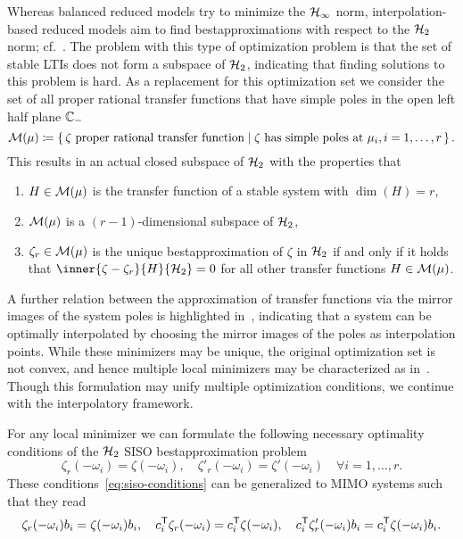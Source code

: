 Whereas balanced reduced models try to minimize the $\mathcal{H}_\infty$ norm, interpolation-based reduced models aim to find bestapproximations with respect to the $\mathcal{H}_2$ norm; cf.~\cite[Section~3]{Gugercin2008}.
The problem with this type of optimization problem is that the set of stable \acp{LTI} does not form a subspace of $\mathcal{H}_2$, indicating that finding solutions to this problem is hard.
As a replacement for this optimization set we consider the set of all proper rational transfer functions that have simple poles in the open left half plane $\mathbb{C}_{-}$
\begin{equation*}
    \mathcal{M}(\mu) \coloneqq \left\{\,\zeta \text{ proper rational transfer function}\mid\zeta \text{ has simple poles at } \mu_i, i = 1, \dots, r\,\right\}.
\end{equation*}
This results in an actual closed subspace of $\mathcal{H}_2$ with the properties that
\begin{enumerate}
    \item $H \in \mathcal{M}(\mu)$ is the transfer function of a stable system with $\dim{(H)} = r$,
    \item $\mathcal{M}(\mu)$ is a $(r - 1)$-dimensional subspace of $\mathcal{H}_2$,
    \item $\zeta_r \in \mathcal{M}(\mu)$ is the unique bestapproximation of $\zeta$ in $\mathcal{H}_2$ if and only if it holds that $\inner{\zeta - \zeta_r}{H}{\mcl{H}_2} = 0$ for all other transfer functions $H \in \mathcal{M}(\mu)$.
\end{enumerate}
A further relation between the approximation of transfer functions via the mirror images of the system poles is highlighted in~\cite[Section~3.1]{Gugercin2008}, indicating that a system can be optimally interpolated by choosing the mirror images of the poles as interpolation points.
While these minimizers may be unique, the original optimization set is not convex, and hence multiple local minimizers may be characterized as in~\cite[Theorem~3.2]{Gugercin2008}.
Though this formulation may unify multiple optimization conditions, we continue with the interpolatory framework.


For any local minimizer we can formulate the following necessary optimality conditions of the $\mathcal{H}_2$ SISO bestapproximation problem
\begin{equation}\label{eq:siso-conditions}
    \zeta_r(- \omega_i) = \zeta(- \omega_i),\quad \zeta'_r(- \omega_i) = \zeta'(- \omega_i) \quad \forall i = 1, \dots, r.
\end{equation}
These conditions~\eqref{eq:siso-conditions} can be generalized to MIMO systems such that they read
\begin{equation}\label{eq:mimo-conditions}
    \zeta_r(- \omega_i) b_i = \zeta(- \omega_i) b_i,\quad c_i^{\mkern1mu \mathsf{T}} \zeta_r(- \omega_i) = c_i^{\mkern1mu \mathsf{T}} \zeta(- \omega_i),\quad c_i^{\mkern1mu \mathsf{T}} \zeta'_r(- \omega_i) b_i = c_i^{\mkern1mu \mathsf{T}} \zeta(- \omega_i) b_i.
\end{equation}

